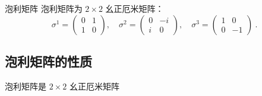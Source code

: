 

\begin{definition}{泡利矩阵}
泡利矩阵为 $2\times 2$ 幺正厄米矩阵：
\begin{equation}
\sigma^1 = \begin{pmatrix}
0 & 1\\
1 & 0
\end{pmatrix},\quad 
\sigma^2 = \begin{pmatrix}
0 & -i\\
i & 0
\end{pmatrix},\quad 
\sigma^3 = 
\begin{pmatrix}
1 & 0\\
0 & -1
\end{pmatrix}
~.
\end{equation}
\end{definition}

\subsection{泡利矩阵的性质}
泡利矩阵是 $2\times 2$ 幺正厄米矩阵